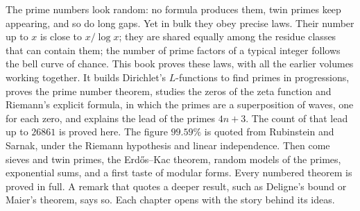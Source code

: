 The prime numbers look random: no formula produces them, twin primes keep appearing, and so do long gaps. Yet in bulk
they obey precise laws. Their number up to $x$ is close to $x/\log x$; they are shared equally among the residue classes
that can contain them; the number of prime factors of a typical integer follows the bell curve of chance. This book proves
these laws, with all the earlier volumes working together. It builds Dirichlet's $L$-functions to find primes in progressions, proves the prime number theorem, studies
the zeros of the zeta function and Riemann's explicit formula, in which the primes are a superposition of waves, one
for each zero, and explains the lead of the primes $4n+3$. The count of that lead up to $26861$ is proved here. The figure $99.59\%$ is quoted from Rubinstein and Sarnak, under the Riemann hypothesis and linear independence. Then come sieves and
twin primes, the Erd\H{o}s--Kac theorem, random models of the primes, exponential sums, and a first taste of modular
forms. Every numbered theorem is proved in full. A remark that quotes a deeper result, such as Deligne's bound or Maier's theorem, says so. Each chapter opens with the story behind its ideas.
